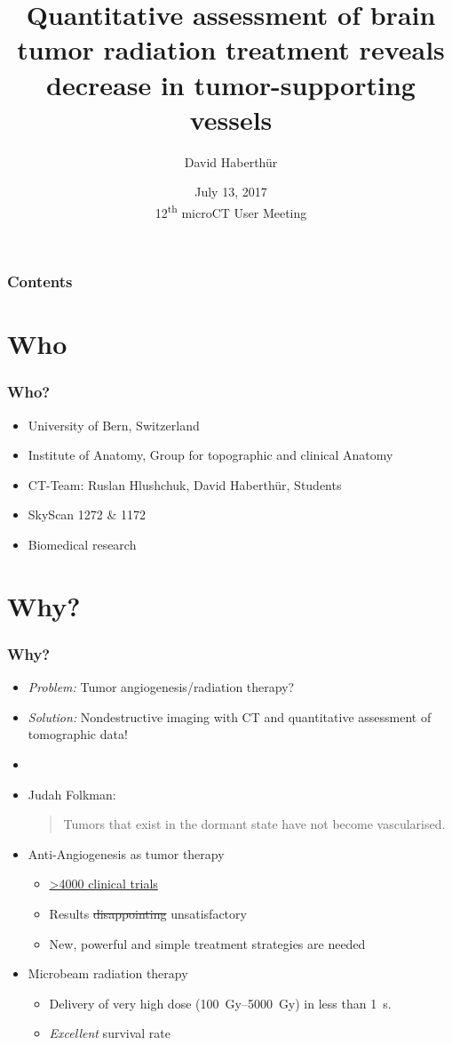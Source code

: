\documentclass{beamer}
\title[Quantitative assessment of brain tumor vasculature]{Quantitative assessment of brain tumor radiation treatment reveals decrease in tumor-supporting vessels}
\author{David Haberthür}
\institute{Institute of Anatomy, University of Bern}
\date{July 13, 2017\\12\textsuperscript{th} microCT User Meeting}
\newcommand{\uct}{\si{\micro}CT\xspace} %
\begin{document}
{%
\begin{frame}%
	\titlepage%
\end{frame}%
}
\setcounter{framenumber}{0}

\begin{frame}
	\frametitle{Contents}
	\tableofcontents
\end{frame}

\section{Who}
\begin{frame}
	\frametitle{Who?}
	\begin{itemize}
		\item University of Bern, Switzerland
		\item Institute of Anatomy, Group for topographic and clinical Anatomy
		\item \uct-Team: Ruslan Hlushchuk, David Haberthür, Students
		\item SkyScan 1272 \& 1172
		\item Biomedical research
	\end{itemize}
\end{frame}

\section{Why?}
\begin{frame}
	\frametitle{Why?}
	\begin{itemize}
		\item \emph{Problem:} Tumor angiogenesis/radiation therapy?
		\pause
		\item \emph{Solution:} Nondestructive imaging with \uct and quantitative assessment of tomographic data!
		\item[]
		\pause
		\item Judah Folkman: \blockquote[\cite{Sherwood1971}]{Tumors that exist in the dormant state have not become vascularised.}
		\item Anti-Angiogenesis as tumor therapy
		\begin{itemize}
			\item \href{https://clinicaltrials.gov/ct2/results?term=antiangiogenic}{\textgreater4000 clinical trials}
			\item Results \sout{disappointing} unsatisfactory
			\item New, powerful and simple treatment strategies are needed
		\end{itemize}
		\item Microbeam radiation therapy
		\begin{itemize}
			\item Delivery of very high dose (\SIrange{100}{5000}{\gray}) in less than \SI{1}{\second}.
			\item \emph{Excellent} survival rate \cite{Laissue1998}
		\end{itemize}
	\end{itemize}
\end{frame}
\end{document}
